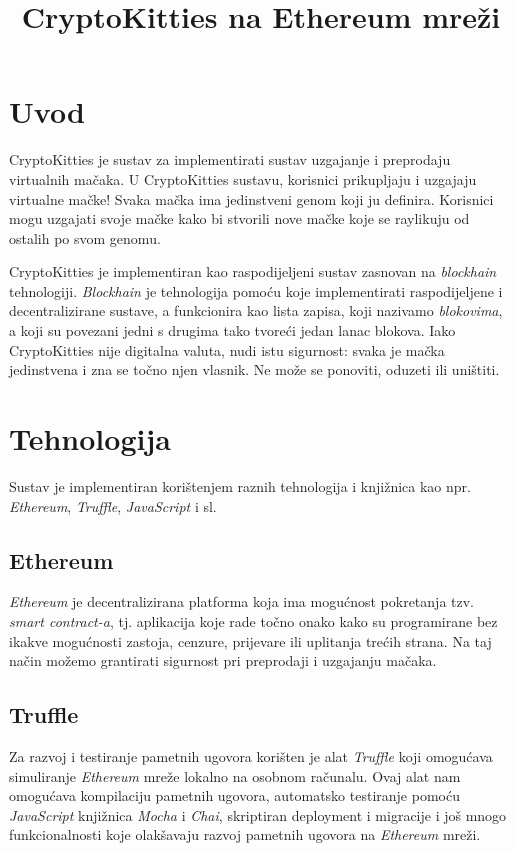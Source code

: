 \documentclass[times, utf8, tehnicka_dokumentacija]{fer}
\def \naslov {CryptoKitties na Ethereum mreži}
\def \ver {1.0}
\def \broj {4}
\def \mentor {Federico Matteo Benčić}
\begin{document}
\title{\naslov}
\verzija{\ver}
\author{\tim}
\size{\broj}
\voditelj{\mentor}

\maketitle
\tableofcontents

\chapter{Uvod}
CryptoKitties je sustav za implementirati sustav uzgajanje i preprodaju virtualnih mačaka. U CryptoKitties sustavu, korisnici prikupljaju i uzgajaju virtualne mačke! Svaka mačka ima jedinstveni genom koji ju definira. Korisnici mogu uzgajati svoje mačke kako bi stvorili nove mačke koje se raylikuju od ostalih po svom genomu.

CryptoKitties je implementiran kao raspodijeljeni sustav zasnovan na {\it blockhain} tehnologiji. {\it Blockhain} je tehnologija pomoću koje implementirati raspodijeljene i decentralizirane sustave, a funkcionira kao lista zapisa, koji nazivamo {\it blokovima}, a koji su povezani jedni s drugima tako tvoreći jedan lanac blokova. Iako CryptoKitties nije digitalna valuta, nudi istu sigurnost: svaka je mačka jedinstvena i zna se točno njen vlasnik. Ne može se ponoviti, oduzeti ili uništiti.

\chapter{Tehnologija}
Sustav je implementiran korištenjem raznih tehnologija i knjižnica kao npr. {\it Ethereum}, {\it Truffle}, {\it JavaScript} i sl.

\section{Ethereum}
{\it Ethereum}  je decentralizirana platforma koja ima mogućnost pokretanja tzv. {\it smart contract-a}, tj. aplikacija koje rade točno onako kako su programirane bez ikakve mogućnosti zastoja, cenzure, prijevare ili uplitanja trećih strana. Na taj način možemo grantirati sigurnost pri preprodaji i uzgajanju mačaka.

\section{Truffle}
Za razvoj i testiranje pametnih ugovora korišten je alat {\it Truffle} koji omogućava simuliranje {\it Ethereum} mreže lokalno na osobnom računalu. Ovaj alat nam omogućava kompilaciju pametnih ugovora, automatsko testiranje pomoću {\it JavaScript} knjižnica {\it Mocha} i {\it Chai}, skriptiran deployment i migracije i još mnogo funkcionalnosti koje olakšavaju razvoj pametnih ugovora na {\it Ethereum} mreži.
\end{document}
